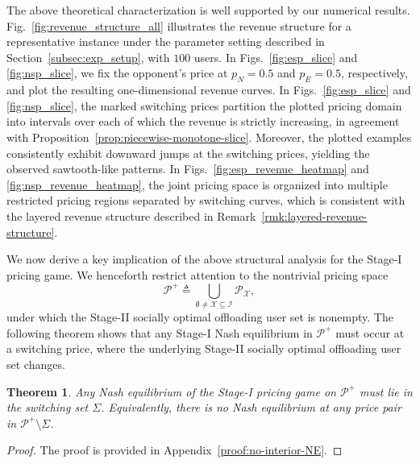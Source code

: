 \documentclass[lettersize,journal]{IEEEtran}
\newtheorem{theorem}{Theorem}
\begin{document}
The above theoretical characterization is well supported by our numerical results. Fig.~\ref{fig:revenue_structure_all} illustrates the revenue structure for a representative instance under the parameter setting described in Section~\ref{subsec:exp_setup}, with $100$ users. 
In Figs.~\ref{fig:esp_slice} and \ref{fig:nsp_slice}, we fix the opponent's price at $p_N=0.5$ and $p_E=0.5$, respectively, and plot the resulting one-dimensional revenue curves. In Figs.~\ref{fig:esp_slice} and \ref{fig:nsp_slice}, the marked switching prices partition the plotted pricing domain into intervals over each of which the revenue is strictly increasing, in agreement with Proposition~\ref{prop:piecewise-monotone-slice}. Moreover, the plotted examples consistently exhibit downward jumps at the switching prices, yielding the observed sawtooth-like patterns. In Figs.~\ref{fig:esp_revenue_heatmap} and \ref{fig:nsp_revenue_heatmap}, the joint pricing space is organized into multiple restricted pricing regions separated by switching curves, which is consistent with the layered revenue structure described in Remark~\ref{rmk:layered-revenue-structure}.

We now derive a key implication of the above structural analysis for the Stage-I pricing game. We henceforth restrict attention to the nontrivial pricing space
\[
\mathcal P^{+}\triangleq \bigcup_{\emptyset\neq \mathcal X\subseteq\mathcal I}\mathcal P_{\mathcal X},
\]
under which the Stage-II socially optimal offloading user set is nonempty. The following theorem shows that any Stage-I Nash equilibrium in $\mathcal P^+$ must occur at a switching price, where the underlying Stage-II socially optimal offloading user set changes.

\begin{theorem}
\label{thm:no-interior-NE}
Any Nash equilibrium of the Stage-I pricing game on $\mathcal P^{+}$ must lie in the switching set $\Sigma$.
Equivalently, there is no Nash equilibrium at any price pair in $\mathcal P^{+}\setminus\Sigma$.
\end{theorem}

\begin{proof}
The proof is provided in Appendix~\ref{proof:no-interior-NE}.
\end{proof}
\end{document}
